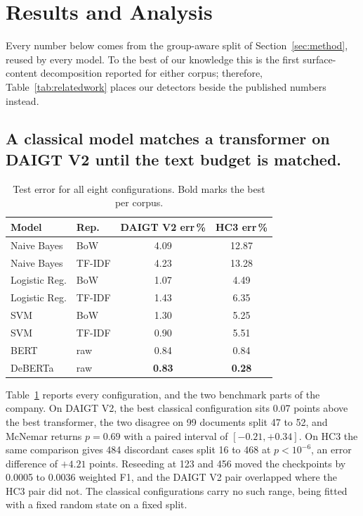 \documentclass[conference,a4paper]{IEEEtran}
\newcommand{\secref}[1]{\hyperref[#1]{\ref*{#1}}}
\newcommand{\tabref}[1]{\hyperref[#1]{\ref*{#1}}}
\begin{document}
\section{Results and Analysis}
\label{sec:results}

Every number below comes from the group-aware split of Section~\secref{sec:method}, reused by every model. To the best of our knowledge this is the first surface-content decomposition reported for either corpus; therefore, Table~\tabref{tab:relatedwork} places our detectors beside the published numbers instead.

\subsection{A classical model matches a transformer on DAIGT V2 until the text budget is matched.}

\begin{table}[!t]
\centering
\caption{Test error for all eight configurations. Bold marks the best per corpus.}
\label{tab:models}
\scriptsize
\setlength{\tabcolsep}{4pt}
\begin{tabular}{@{}llcc@{}}
\toprule
Model & Rep. & DAIGT V2 err\,\% & HC3 err\,\% \\
\midrule
Naive Bayes & BoW & 4.09 & 12.87 \\
Naive Bayes & TF-IDF & 4.23 & 13.28 \\
Logistic Reg. & BoW & 1.07 & 4.49 \\
Logistic Reg. & TF-IDF & 1.43 & 6.35 \\
SVM & BoW & 1.30 & 5.25 \\
SVM & TF-IDF & 0.90 & 5.51 \\
BERT & raw & 0.84 & 0.84 \\
DeBERTa & raw & \textbf{0.83} & \textbf{0.28} \\
\bottomrule
\end{tabular}
\end{table}

Table~\tabref{tab:models} reports every configuration, and the two benchmark parts of the company. On DAIGT V2, the best classical configuration sits 0.07 points above the best transformer, the two disagree on 99 documents split 47 to 52, and McNemar returns $p=0.69$ with a paired interval of $[-0.21, +0.34]$. On HC3 the same comparison gives 484 discordant cases split 16 to 468 at $p < 10^{-6}$, an error difference of $+4.21$ points. Reseeding at 123 and 456 moved the checkpoints by 0.0005 to 0.0036 weighted F1, and the DAIGT V2 pair overlapped where the HC3 pair did not. The classical configurations carry no such range, being fitted with a fixed random state on a fixed split.
\end{document}
